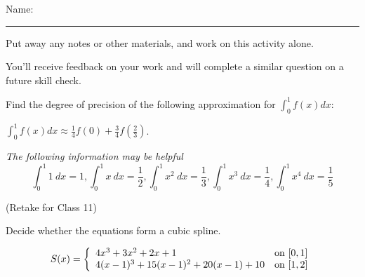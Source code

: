 \documentclass[12pt,letterpaper,noanswers]{exam}
\begin{document}
 \pdfpageheight 11in 
  \pdfpagewidth 8.5in

\noindent Name: \rule{2.5in}{0.5pt}

\noindent Put away any notes or other materials, and work on this activity alone.

\noindent You'll receive feedback on your work and will complete a similar question on a future skill check.


\begin{questions}
\item Find the degree of precision of the following approximation for $\displaystyle\int_{0}^1 f(x)dx$:

$\displaystyle\int_{0}^1 f(x)dx\approx \frac{1}{4}f(0) + \frac{3}{4}f\left(\frac{2}{3}\right)$.

\emph{The following information may be helpful}
\[\int_{0}^1 1\ dx = 1, \int_{0}^1 x\ dx = \frac{1}{2}, \int_{0}^1 x^2\ dx = \frac{1}{3}, \int_{0}^1 x^3\ dx = \frac{1}{4}, \int_{0}^1 x^4\ dx = \frac{1}{5}\]

\vspace{6.5cm}

\item (Retake for Class 11)

Decide whether the equations form a cubic spline.

\[S(x) = \left\{\begin{array}{l l}
4x^3 + 3x^2 + 2x + 1 & \text{on }[0,1] \\
4(x-1)^3 + 15(x-1)^2 + 20(x-1) + 10 & \text{on }[1,2] \\
\end{array}\right.\]

\end{questions}
\end{document}
